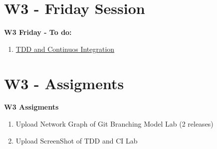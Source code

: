 \documentclass{beamer}
\begin{document}
\section{W3 - Friday Session }

\begin{frame}

\textbf{W3 Friday - To do:}

\begin{enumerate}
\item
	\href{https://github.com/adsoftsito/tdd/blob/master/w3/helloworld.tex}{TDD and Continuos Integration} 
\end{enumerate} 


\end{frame}



\section{W3 - Assigments }

\begin{frame}


\textbf{W3 Assigments}


\begin{enumerate}
\item
	 
	Upload Network Graph of Git Branching Model Lab (2 releases)
\item
	Upload ScreenShot of TDD and CI Lab

\end{enumerate} 


\end{frame}
\end{document}
